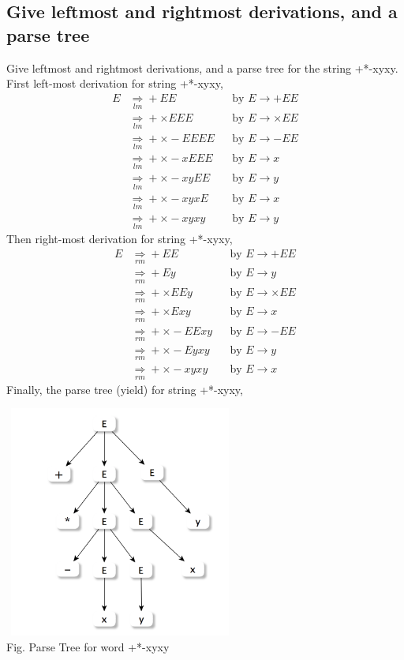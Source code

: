 \documentclass[11pt,a4paper]{article}
\newcommand{\htab}{\hspace*{0.63cm}}
\newcommand{\pg}{\\[0.3cm]}
\newcommand{\lmd}{\underset{lm}{\Longrightarrow}}
\newcommand{\rmd}{\underset{rm}{\Longrightarrow}}
\begin{document}
\subsection{Give leftmost and rightmost derivations, and a parse tree}
\htab Give leftmost and rightmost derivations, and a parse tree for the string +*-xyxy. \pg
\htab First left-most derivation for string +*-xyxy,
    \begin{align}
        E & \lmd +EE &&\mbox{by $E \rightarrow +EE$} \\
          & \lmd +\times EEE &&\mbox{by $E \rightarrow \times EE$}\\
              & \lmd +\times - EEEE &&\mbox{by $E \rightarrow -EE$}\\ 
              & \lmd +\times -xEEE &&\mbox{by $E \rightarrow x$}\\
              & \lmd +\times -xyEE &&\mbox{by $E \rightarrow y$}\\
              & \lmd +\times -xyxE  &&\mbox{by $E \rightarrow x$}\\
              & \lmd +\times -xyxy &&\mbox{by $E \rightarrow y$}
    \end{align}
\htab Then right-most derivation for string +*-xyxy,
    \begin{align}
            E & \rmd +EE &&\mbox{by $E \rightarrow +EE$}\\
              & \rmd +Ey &&\mbox{by $E \rightarrow y$}\\
              & \rmd +\times EEy &&\mbox{by $E \rightarrow \times EE$}\\ 
              & \rmd +\times Exy &&\mbox{by $E \rightarrow x$}\\
              & \rmd +\times -EExy &&\mbox{by $E \rightarrow -EE$}\\
              & \rmd +\times -Eyxy  &&\mbox{by $E \rightarrow y$}\\
              & \rmd +\times -xyxy &&\mbox{by $E \rightarrow x$}
    \end{align}
\htab Finally, the parse tree (yield) for string +*-xyxy,
    \begin{center}
        \includegraphics[width=3in,height=3in]{./graphs/parseTree.png}\\
        \footnotesize Fig. Parse Tree for word +*-xyxy
    \end{center}
\newpage
\end{document}
